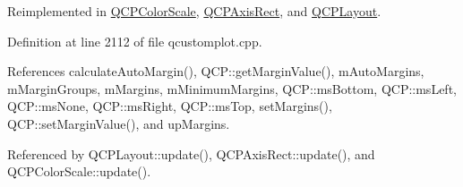 Reimplemented in \hyperlink{class_q_c_p_color_scale_ab8f6991ac88243fc582b44b183670334}{Q\+C\+P\+Color\+Scale}, \hyperlink{class_q_c_p_axis_rect_a255080a017df9083a60a321ef2ba9ed8}{Q\+C\+P\+Axis\+Rect}, and \hyperlink{class_q_c_p_layout_a34ab477e820537ded7bade4399c482fd}{Q\+C\+P\+Layout}.



Definition at line 2112 of file qcustomplot.\+cpp.



References calculate\+Auto\+Margin(), Q\+C\+P\+::get\+Margin\+Value(), m\+Auto\+Margins, m\+Margin\+Groups, m\+Margins, m\+Minimum\+Margins, Q\+C\+P\+::ms\+Bottom, Q\+C\+P\+::ms\+Left, Q\+C\+P\+::ms\+None, Q\+C\+P\+::ms\+Right, Q\+C\+P\+::ms\+Top, set\+Margins(), Q\+C\+P\+::set\+Margin\+Value(), and up\+Margins.



Referenced by Q\+C\+P\+Layout\+::update(), Q\+C\+P\+Axis\+Rect\+::update(), and Q\+C\+P\+Color\+Scale\+::update().


